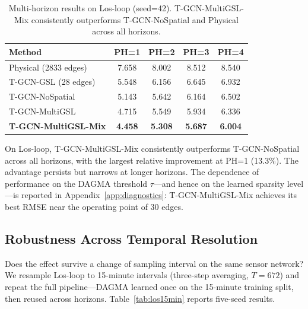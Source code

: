 \begin{table}[t]
\centering
\caption{Multi-horizon results on Los-loop (seed=42). T-GCN-MultiGSL-Mix consistently outperforms T-GCN-NoSpatial and Physical across all horizons.}
\label{tab:multiph}
\begin{tabular}{lcccc}
\toprule
\textbf{Method} & \textbf{PH=1} & \textbf{PH=2} & \textbf{PH=3} & \textbf{PH=4} \\
\midrule
Physical (2833 edges) & 7.658 & 8.002 & 8.512 & 8.540 \\
T-GCN-GSL (28 edges) & 5.548 & 6.156 & 6.645 & 6.932 \\
T-GCN-NoSpatial & 5.143 & 5.642 & 6.164 & 6.502 \\
T-GCN-MultiGSL & 4.715 & 5.549 & 5.934 & 6.336 \\
\textbf{T-GCN-MultiGSL-Mix} & \textbf{4.458} & \textbf{5.308} & \textbf{5.687} & \textbf{6.004} \\
\bottomrule
\end{tabular}
\end{table}

On Los-loop, T-GCN-MultiGSL-Mix consistently outperforms T-GCN-NoSpatial across all horizons, with the largest relative improvement at PH=1 (13.3\%). The advantage persists but narrows at longer horizons. The dependence of performance on the DAGMA threshold $\tau$---and hence on the learned sparsity level---is reported in Appendix~\ref{app:diagnostics}: T-GCN-MultiGSL-Mix achieves its best RMSE near the operating point of 30 edges.

\subsection{Robustness Across Temporal Resolution}\label{sec:los15min}

Does the effect survive a change of sampling interval on the same sensor network? We resample Los-loop to 15-minute intervals (three-step averaging, $T=672$) and repeat the full pipeline---DAGMA learned once on the 15-minute training split, then reused across horizons. Table~\ref{tab:los15min} reports five-seed results.

